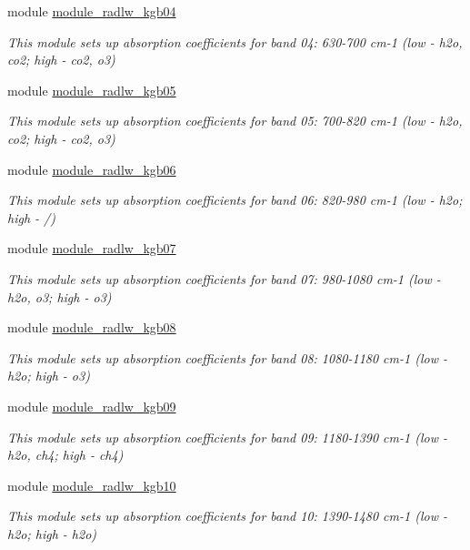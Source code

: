 \begin{DoxyCompactItemize}
module \hyperlink{namespacemodule__radlw__kgb04}{module\+\_\+radlw\+\_\+kgb04}
\begin{DoxyCompactList}\small\item\em This module sets up absorption coefficients for band 04\+: 630-\/700 cm-\/1 (low -\/ h2o, co2; high -\/ co2, o3) \end{DoxyCompactList}\item 
module \hyperlink{namespacemodule__radlw__kgb05}{module\+\_\+radlw\+\_\+kgb05}
\begin{DoxyCompactList}\small\item\em This module sets up absorption coefficients for band 05\+: 700-\/820 cm-\/1 (low -\/ h2o, co2; high -\/ co2, o3) \end{DoxyCompactList}\item 
module \hyperlink{namespacemodule__radlw__kgb06}{module\+\_\+radlw\+\_\+kgb06}
\begin{DoxyCompactList}\small\item\em This module sets up absorption coefficients for band 06\+: 820-\/980 cm-\/1 (low -\/ h2o; high -\/ /) \end{DoxyCompactList}\item 
module \hyperlink{namespacemodule__radlw__kgb07}{module\+\_\+radlw\+\_\+kgb07}
\begin{DoxyCompactList}\small\item\em This module sets up absorption coefficients for band 07\+: 980-\/1080 cm-\/1 (low -\/ h2o, o3; high -\/ o3) \end{DoxyCompactList}\item 
module \hyperlink{namespacemodule__radlw__kgb08}{module\+\_\+radlw\+\_\+kgb08}
\begin{DoxyCompactList}\small\item\em This module sets up absorption coefficients for band 08\+: 1080-\/1180 cm-\/1 (low -\/ h2o; high -\/ o3) \end{DoxyCompactList}\item 
module \hyperlink{namespacemodule__radlw__kgb09}{module\+\_\+radlw\+\_\+kgb09}
\begin{DoxyCompactList}\small\item\em This module sets up absorption coefficients for band 09\+: 1180-\/1390 cm-\/1 (low -\/ h2o, ch4; high -\/ ch4) \end{DoxyCompactList}\item 
module \hyperlink{namespacemodule__radlw__kgb10}{module\+\_\+radlw\+\_\+kgb10}
\begin{DoxyCompactList}\small\item\em This module sets up absorption coefficients for band 10\+: 1390-\/1480 cm-\/1 (low -\/ h2o; high -\/ h2o) \end{DoxyCompactList}\item 

\end{DoxyCompactItemize}
